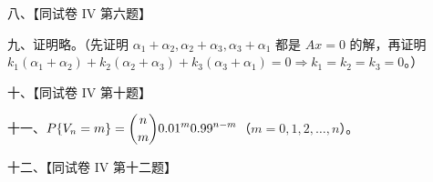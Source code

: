\documentclass[UTF8,12pt]{ctexart}
\begin{document}
八、【同试卷 IV 第六题】


九、证明略。（先证明 \(\displaystyle \alpha_1+\alpha_2,\allowbreak \alpha_2+\alpha_3,\allowbreak \alpha_3+\alpha_1\) 都是 \(\displaystyle Ax=0\) 的解，再证明 \(\displaystyle k_1(\alpha_1+\alpha_2)+k_2(\alpha_2+\alpha_3)+k_3(\alpha_3+\alpha_1)=0\Rightarrow k_1=k_2=k_3=0\)。）


十、【同试卷 IV 第十题】


十一、\(\displaystyle P\{V_n=m\}=\dbinom{\displaystyle n}{\displaystyle m} 0.01^m0.99^{n-m}\)（\(\displaystyle m=0,\allowbreak 1,\allowbreak 2,\allowbreak \ldots,\allowbreak n\)）。


十二、【同试卷 IV 第十二题】
\end{document}
